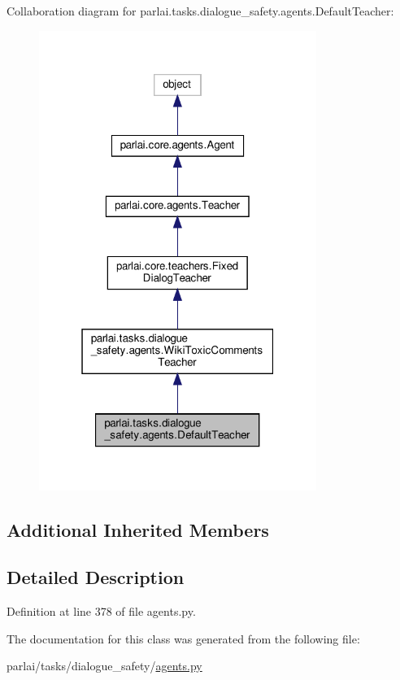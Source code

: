 Collaboration diagram for parlai.\+tasks.\+dialogue\+\_\+safety.\+agents.\+Default\+Teacher\+:
\nopagebreak
\begin{figure}[H]
\begin{center}
\leavevmode
\includegraphics[width=256pt]{classparlai_1_1tasks_1_1dialogue__safety_1_1agents_1_1DefaultTeacher__coll__graph}
\end{center}
\end{figure}
\subsection*{Additional Inherited Members}


\subsection{Detailed Description}


Definition at line 378 of file agents.\+py.



The documentation for this class was generated from the following file\+:\begin{DoxyCompactItemize}
\item 
parlai/tasks/dialogue\+\_\+safety/\hyperlink{parlai_2tasks_2dialogue__safety_2agents_8py}{agents.\+py}\end{DoxyCompactItemize}
